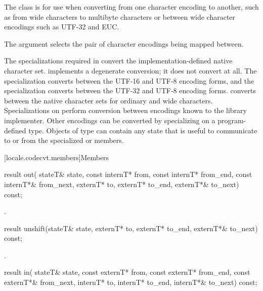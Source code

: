 \pnum
The class  is for use
when converting from one character encoding to another,
such as from wide characters to multibyte characters or
between wide character encodings such as UTF-32 and EUC.

\pnum
The  argument selects
the pair of character encodings being mapped between.

\pnum
The specializations required
in 
convert the implementation-defined native character set.
 implements a degenerate conversion;
it does not convert at all.
The specialization 
converts between the UTF-16 and UTF-8 encoding forms, and
the specialization  
converts between the UTF-32 and UTF-8 encoding forms.
converts between the native character sets for ordinary and wide characters.
Specializations on 
perform conversion between encodings known to the library implementer.
Other encodings can be converted by specializing on
a program-defined  type.
Objects of type  can contain any state
that is useful to communicate to or from
the specialized  or  members.

[locale.codecvt.members]{Members}

%
\begin{itemdecl}
result out(
  stateT& state,
  const internT* from, const internT* from_end, const internT*& from_next,
  externT* to, externT* to_end, externT*& to_next) const;
\end{itemdecl}

\begin{itemdescr}
\pnum
\returns
{}.
\end{itemdescr}

%
\begin{itemdecl}
result unshift(stateT& state, externT* to, externT* to_end, externT*& to_next) const;
\end{itemdecl}

\begin{itemdescr}
\pnum
\returns
{}.
\end{itemdescr}

%
\begin{itemdecl}
result in(
  stateT& state,
  const externT* from, const externT* from_end, const externT*& from_next,
  internT* to, internT* to_end, internT*& to_next) const;
\end{itemdecl}

